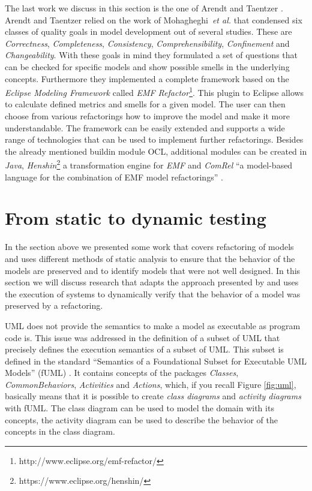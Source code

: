 \documentclass{llncs}
\begin{document}
The last work we discuss in this section is the one of Arendt and Taentzer \cite{DBLP:conf/models/ArendtTW13}.
Arendt and Taentzer relied on the work of Mohagheghi~\textit{et al.} \cite{DBLP:journals/infsof/MohagheghiDN09} that condensed
six classes of quality goals in model development out of several studies. These are \textit{Correctness},
\textit{Completeness}, \textit{Consistency}, \textit{Comprehensibility}, \textit{Confinement} and
\textit{Changeability}. With these goals in mind they formulated a set of questions that can be checked for specific
models and show possible smells in the underlying concepts. Furthermore they implemented a complete framework based
on the \textit{Eclipse Modeling Framework} \cite{Steinberg:2009:EEM:1197540} called \textit{EMF
Refactor}\footnote{http://www.eclipse.org/emf-refactor/}. This plugin to Eclipse allows to calculate defined
metrics and smells for a given model. The user can then choose from various refactorings how to improve the
model and make it more understandable. The framework can be easily extended and supports a wide range of technologies
that can be used to implement further refactorings. Besides the already mentioned buildin module OCL,
additional modules can be created in \textit{Java}, \textit{Henshin}\footnote{https://www.eclipse.org/henshin/} a
transformation engine for \textit{EMF} and \textit{ComRel} ``a model-based language for the combination of EMF model
refactorings'' \cite{DBLP:journals/infsof/MohagheghiDN09}.

\section{From static to dynamic testing}
\label{sec:todynamics}

In the section above we presented some work that covers refactoring of models and uses different methods of static
analysis to ensure that the behavior of the models are preserved and to identify models that were not well designed. In
this section we will discuss research that adapts the approach presented by \cite{rob99} and uses the execution of
systems to dynamically verify that the behavior of a model was preserved by a refactoring.

UML does not provide the semantics to make a model as executable as program code is. This issue was addressed in
the definition of a subset of UML that precisely defines the execution semantics of a subset of UML. This
subset is defined in the standard ``Semantics of a Foundational Subset for Executable UML Models'' (fUML) 
\cite{man:FUML}. It contains concepts of the packages \textit{Classes}, \textit{CommonBehaviors}, \textit{Activities} and \textit{Actions}, which, 
if you recall Figure \ref{fig:uml},  basically means that it is possible to create 
\textit{class diagrams} and \textit{activity diagrams} with fUML. The class diagram can be used to model the domain with its concepts, the activity diagram can be used
to describe the behavior of the concepts in the class diagram.
\end{document}
